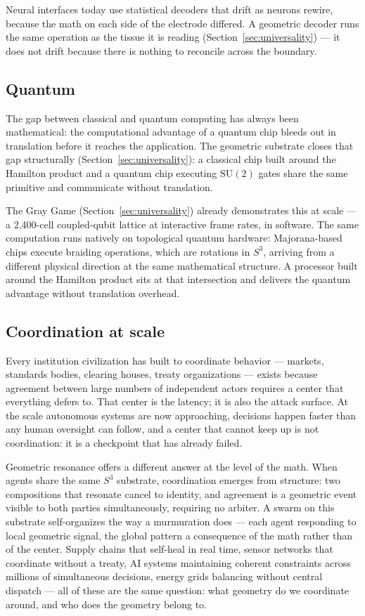 \documentclass[12pt,a4paper]{article}
\theoremstyle{definition}
\theoremstyle{remark}
\begin{document}
Neural interfaces today use statistical decoders that drift as neurons
rewire, because the math on each side of the electrode differed.
A geometric decoder runs the same operation as the tissue it is reading
(Section~\ref{sec:universality}) --- it does not drift because
there is nothing to reconcile across the boundary.

\subsection{Quantum}

The gap between classical and quantum computing has always been mathematical:
the computational advantage of a quantum chip bleeds out in translation
before it reaches the application. The geometric substrate closes that gap
structurally (Section~\ref{sec:universality}): a classical chip built around
the Hamilton product and a quantum chip executing $\mathrm{SU}(2)$ gates
share the same primitive and communicate without translation.

The Gray Game (Section~\ref{sec:universality}) already demonstrates
this at scale --- a 2,400-cell coupled-qubit lattice at interactive
frame rates, in software. The same computation runs natively on
topological quantum hardware: Majorana-based chips execute braiding
operations, which are rotations in $S^3$, arriving from a different
physical direction at the same mathematical structure. A processor
built around the Hamilton product sits at that intersection and
delivers the quantum advantage without translation overhead.

\subsection{Coordination at scale}

Every institution civilization has built to coordinate behavior --- markets,
standards bodies, clearing houses, treaty organizations --- exists because
agreement between large numbers of independent actors requires a center
that everything defers to. That center is the latency; it is also the attack
surface. At the scale autonomous systems are now approaching, decisions
happen faster than any human oversight can follow, and a center that cannot
keep up is not coordination: it is a checkpoint that has already failed.

Geometric resonance offers a different answer at the level of the math.
When agents share the same $S^3$ substrate, coordination emerges from
structure: two compositions that resonate cancel to identity, and agreement
is a geometric event visible to both parties simultaneously, requiring no
arbiter. A swarm on this substrate self-organizes the way a murmuration
does --- each agent responding to local geometric signal, the global pattern
a consequence of the math rather than of the center. Supply chains that
self-heal in real time, sensor networks that coordinate without a treaty,
AI systems maintaining coherent constraints across millions of simultaneous
decisions, energy grids balancing without central dispatch --- all of these
are the same question: what geometry do we coordinate around, and who does
the geometry belong to.
\end{document}
